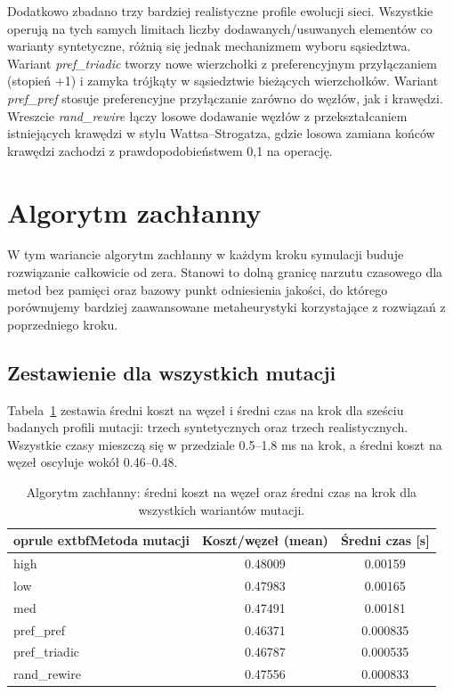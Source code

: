 Dodatkowo zbadano trzy bardziej realistyczne profile ewolucji sieci. Wszystkie operują na tych samych limitach liczby dodawanych/usuwanych elementów co warianty syntetyczne, różnią się jednak mechanizmem wyboru sąsiedztwa. Wariant \emph{pref\_triadic} tworzy nowe wierzchołki z preferencyjnym przyłączaniem (stopień +1) i zamyka trójkąty w sąsiedztwie bieżących wierzchołków. Wariant \emph{pref\_pref} stosuje preferencyjne przyłączanie zarówno do węzłów, jak i krawędzi. Wreszcie \emph{rand\_rewire} łączy losowe dodawanie węzłów z przekształcaniem istniejących krawędzi w stylu Wattsa--Strogatza, gdzie losowa zamiana końców krawędzi zachodzi z prawdopodobieństwem 0,1 na operację.

\section{Algorytm zachłanny}

W tym wariancie algorytm zachłanny w każdym kroku symulacji buduje rozwiązanie całkowicie od zera. Stanowi to dolną granicę narzutu czasowego dla metod bez pamięci oraz bazowy punkt odniesienia jakości, do którego porównujemy bardziej zaawansowane metaheurystyki korzystające z rozwiązań z poprzedniego kroku.

\subsection{Zestawienie dla wszystkich mutacji}
Tabela~\ref{tab:greedy-cold-summary} zestawia średni koszt na węzeł i średni czas na krok dla sześciu badanych profili mutacji: trzech syntetycznych oraz trzech realistycznych. Wszystkie czasy mieszczą się w przedziale 0.5--1.8 ms na krok, a średni koszt na węzeł oscyluje wokół 0.46--0.48.

\begin{table}[H]
  \centering
  \caption{Algorytm zachłanny: średni koszt na węzeł oraz średni czas na krok dla wszystkich wariantów mutacji.}
  \label{tab:greedy-cold-summary}
  \begin{tabular}{lcc}
    oprule
    extbf{Metoda mutacji} & \textbf{Koszt/węzeł (mean)} & \textbf{Średni czas [s]} \\
    \midrule
    high                  & 0.48009                     & 0.00159                  \\
    low                   & 0.47983                     & 0.00165                  \\
    med                   & 0.47491                     & 0.00181                  \\
    pref\_pref            & 0.46371                     & 0.000835                 \\
    pref\_triadic         & 0.46787                     & 0.000535                 \\
    rand\_rewire          & 0.47556                     & 0.000833                 \\
    \bottomrule
  \end{tabular}
\end{table}

